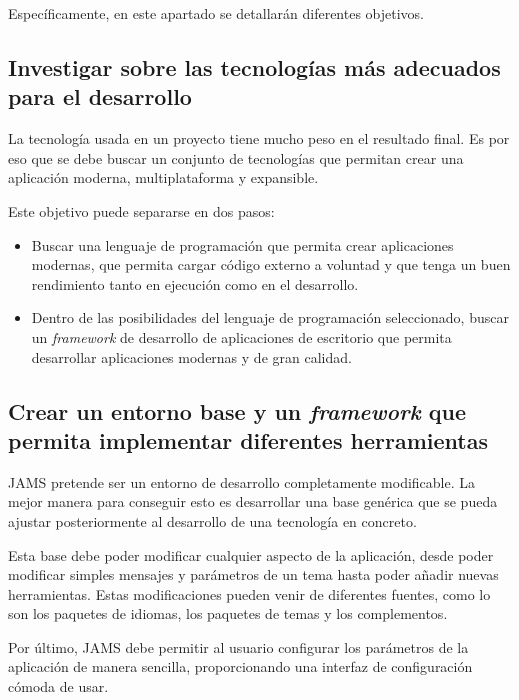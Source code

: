 \noindent Específicamente, en este apartado se detallarán diferentes objetivos.

\subsection{Investigar sobre las tecnologías más adecuados para el desarrollo}
\label{subsec:investigar-sobre-las-tecnologias-mas-adecuados-para-el-desarrollo}

La tecnología usada en un proyecto tiene mucho peso en el resultado final.
Es por eso que se debe buscar un conjunto de tecnologías que permitan crear una aplicación
moderna, multiplataforma y expansible.

\noexpand Este objetivo puede separarse en dos pasos:
\begin{itemize}
    \item Buscar una lenguaje de programación que permita crear aplicaciones modernas,
    que permita cargar código externo a voluntad y que tenga un buen rendimiento
    tanto en ejecución como en el desarrollo.
    \item Dentro de las posibilidades del lenguaje de programación seleccionado,
    buscar un \textit{framework} de desarrollo de aplicaciones de escritorio
    que permita desarrollar aplicaciones modernas y de gran calidad.
\end{itemize}

\subsection{Crear un entorno base y un \textit{framework} que permita implementar diferentes herramientas}
\label{subsec:crear-un-entorno-base-y-un-framework-que-permita-implementar-diferentes-herramientas}

JAMS pretende ser un entorno de desarrollo completamente modificable.
La mejor manera para conseguir esto es desarrollar una base genérica
que se pueda ajustar posteriormente al desarrollo de una tecnología en concreto.

\noindent Esta base debe poder modificar cualquier aspecto de la aplicación,
desde poder modificar simples mensajes y parámetros de un tema hasta poder
añadir nuevas herramientas.
Estas modificaciones pueden venir de diferentes fuentes, como lo son
los paquetes de idiomas, los paquetes de temas y los complementos.

\noindent Por último, JAMS debe permitir al usuario configurar los parámetros
de la aplicación de manera sencilla, proporcionando una interfaz de configuración
cómoda de usar.

